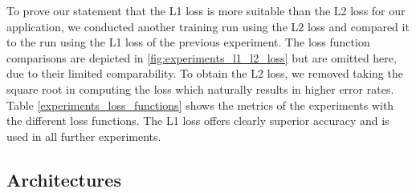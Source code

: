 To prove our statement that the L1 loss is more suitable than the L2 loss for our application, we conducted another training run using the L2 loss and compared it to the run using the L1 loss of the previous experiment. The loss function comparisons are depicted in \ref{fig:experiments_l1_l2_loss} but are omitted here, due to their limited comparability. To obtain the L2 loss, we removed taking the square root in computing the loss which naturally results in higher error rates. Table \ref{experiments_loss_functions} shows the metrics of the experiments with the different loss functions. The L1 loss offers clearly superior accuracy and is used in all further experiments.

\subsection{Architectures} \label{subsection:architectures}



